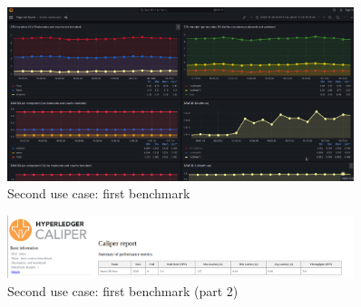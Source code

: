 \begin{figure}[H]
    \centering
    \includegraphics[width=0.9\textwidth]{assets/use-case-2/first-benchmarking.png} %
    \caption{Second use case: first benchmark}
    \label{fig:sample-image} 
\end{figure}

\begin{figure}[H]
    \centering
    \includegraphics[width=0.9\textwidth]{assets/use-case-2/first-benchmarking2.png} %
    \caption{Second use case: first benchmark (part 2)}
    \label{fig:sample-image} 
\end{figure}

